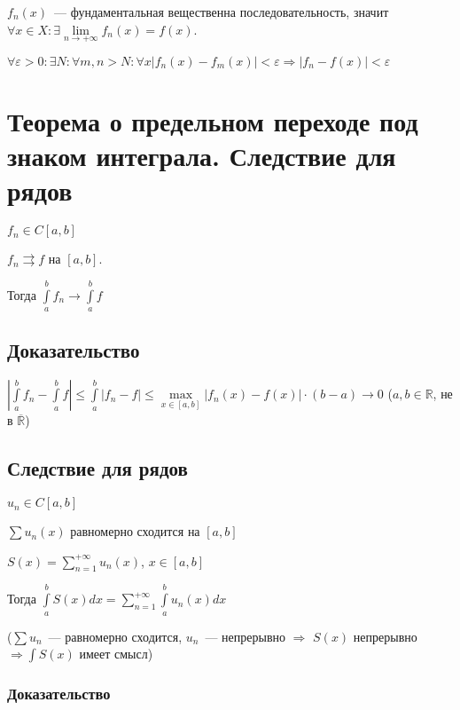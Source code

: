 \documentclass{article}
\begin{document}
            $f_n(x)$~--- фундаментальная вещественна последовательность, значит $\forall x \in X : \exists \lim\limits_{n \rightarrow +\infty} f_n(x) = f(x)$.
            
            $\forall \varepsilon > 0 : \exists N : \forall m, n > N : \forall x | f_n(x) - f_m(x) | < \varepsilon \Rightarrow | f_n - f(x) | < \varepsilon$
            
    \newpage
    
    \section{Теорема о предельном переходе под знаком интеграла. Следствие для рядов}
    
        $f_n \in C[a, b]$
        
        $f_n \rightrightarrows f$ на $[a, b]$.
        
        Тогда $\int\limits^b_a f_n \rightarrow \int\limits^b_a f$
        
        \subsection{Доказательство}
        
            $\left| \int\limits^b_a f_n - \int\limits^b_a f \right| \leq \int\limits^b_a | f_n - f | \leq \max\limits_{x \in [a, b]} | f_n(x) - f(x) | \cdot (b - a) \rightarrow 0$ ($a, b \in \mathbb{R}$, не в $\overline{\mathbb{R}}$)
            
        \subsection{Следствие для рядов}
        
            $u_n \in C[a, b]$
            
            $\sum u_n(x)$ равномерно сходится на $[a, b]$
            
            $S(x) = \sum\limits^{+\infty}_{n = 1} u_n(x)$, $x \in [a, b]$
            
            Тогда $\int\limits^b_a S(x) dx = \sum\limits^{+\infty}_{n = 1} \int\limits^b_a u_n(x) dx$
            
            ($\sum u_n$~--- равномерно сходится, $u_n$~--- непрерывно $\Rightarrow$ $S(x)$ непрерывно $\Rightarrow \int S(x)$ имеет смысл)
            
            \subsubsection{Доказательство}
            
\end{document}
